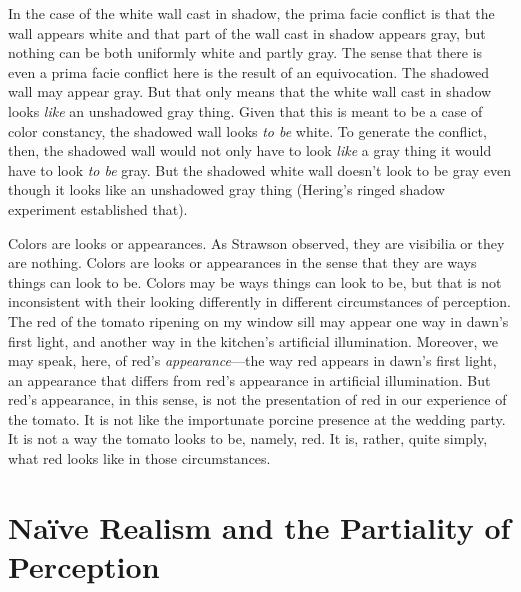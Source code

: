 \documentclass[12pt]{article}
\begin{document}
In the case of the white wall cast in shadow, the prima facie conflict is that the wall appears white and that part of the wall cast in shadow appears gray, but nothing can be both uniformly white and partly gray. The sense that there is even a prima facie conflict here is the result of an equivocation. The shadowed wall may appear gray. But that only means that the white wall cast in shadow looks \emph{like} an unshadowed gray thing. Given that this is meant to be a case of color constancy, the shadowed wall looks \emph{to be} white. To generate the conflict, then, the shadowed wall would not only have to look \emph{like} a gray thing it would have to look \emph{to be} gray. But the shadowed white wall doesn't look to be gray even though it looks like an unshadowed gray thing (Hering's ringed shadow experiment established that).

Colors are looks or appearances. As Strawson observed, they are visibilia or they are nothing. Colors are looks or appearances in the sense that they are ways things can look to be. Colors may be ways things can look to be, but that is not inconsistent with their looking differently in different circumstances of perception. The red of the tomato ripening on my window sill may appear one way in dawn's first light, and another way in the kitchen's artificial illumination. Moreover, we may speak, here, of red's \emph{appearance}---the way red appears in dawn's first light, an appearance that differs from red's appearance in artificial illumination. But red's appearance, in this sense, is not the presentation of red in our experience of the tomato. It is not like the importunate porcine presence at the wedding party. It is not a way the tomato looks to be, namely, red. It is, rather, quite simply, what red looks like in those circumstances.


\section{Naïve Realism and the Partiality of Perception} %
\label{sec:naïve_realism_and_the_partiality_of_perception}
\end{document}
